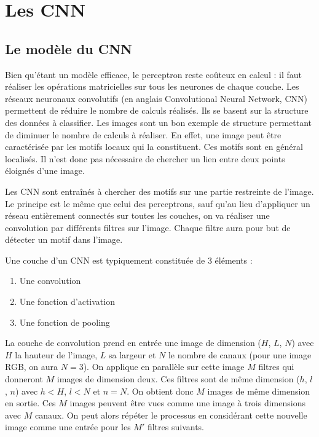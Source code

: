 \section{Les CNN}

\fancyhead[R]{\textit{\nouppercase{\leftmark}}}

\subsection{Le modèle du CNN}

Bien qu'étant un modèle efficace, le perceptron reste coûteux en calcul : il faut réaliser les opérations matricielles sur tous les neurones de chaque couche.
Les réseaux neuronaux convolutifs (en anglais Convolutional Neural Network, CNN) permettent de réduire le nombre de calculs réalisés. Ils se basent sur la structure des données à classifier.
Les images sont un bon exemple de structure permettant de diminuer le nombre de calculs à réaliser. En effet, une image peut être caractérisée par les motifs locaux qui la constituent. Ces motifs sont en général localisés. Il n'est donc pas nécessaire de chercher un lien entre deux points éloignés d'une image.

Les CNN sont entraînés à chercher des motifs sur une partie restreinte de l'image.
Le principe est le même que celui des perceptrons, sauf qu'au lieu d'appliquer un réseau entièrement connectés sur toutes les couches, on va réaliser une convolution par différents filtres sur l'image. Chaque filtre aura pour but de détecter un motif dans l'image.

Une couche d'un CNN est typiquement constituée de 3 éléments : 
\begin{enumerate}
 \item Une convolution
 \item Une fonction d'activation
 \item Une fonction de pooling
\end{enumerate}

La couche de convolution prend en entrée une image de dimension ($H$, $L$, $N$) avec $H$ la hauteur de l'image, $L$ sa largeur et $N$ le nombre de canaux (pour une image RGB, on aura $N = 3$). 
On applique en parallèle sur cette image $M$ filtres qui donneront $M$ images de dimension deux. Ces filtres sont de même dimension ($h$, $l$, $n$) avec $h<H$, $l<N$ et $n=N$. On obtient donc $M$ images de même dimension en sortie. Ces $M$ images peuvent être vues comme une image à trois dimensions avec $M$ canaux. On peut alors répéter le processus en considérant cette nouvelle image comme une entrée pour les $M'$ filtres suivants.

